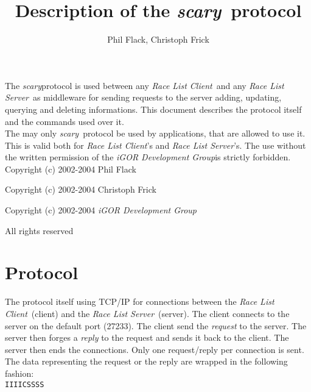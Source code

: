 \documentclass[a4paper,10pt]{article}
\newcommand{\scary}{{\it scary}}
\newcommand{\rls}{{\it Race List Server}}
\newcommand{\rlc}{{\it Race List Client}}
\newcommand{\gplopdev}{{\it iGOR Development Group}}
\newcommand{\scaryport}{27233}
\begin{document}
\title{Description of the \scary\ protocol}
\author{Phil Flack, Christoph Frick}

\maketitle

\vspace{2in}

\abstract

The \scary protocol is used between any \rlc\ and any \rls\ as middleware for
sending requests to the server adding, updating, querying and deleting
informations. This document describes the protocol itself and the commands
used over it.\\

The may only \scary\ protocol be used by applications, that are allowed to use
it. This is valid both for \rlc's and \rls's. The use without the written
permission of the \gplopdev is strictly forbidden.\\

Copyright (c) 2002-2004 Phil Flack
          
Copyright (c) 2002-2004 Christoph Frick
          
Copyright (c) 2002-2004 \gplopdev

All rights reserved

\newpage


\section{Protocol}

The protocol itself using TCP/IP for connections between the \rlc\ (client) and
the \rls\ (server). The client connects to the server on the default port
(\scaryport). The client send the {\it request} to the server. The server then
forges a {\it reply} to the request and sends it back to the client. The
server then ends the connections. Only one request/reply per connection is
sent.\\

The data representing the request or the reply are wrapped in the following
fashion:\\

{\tt IIIICSSSS}\\
\end{document}
